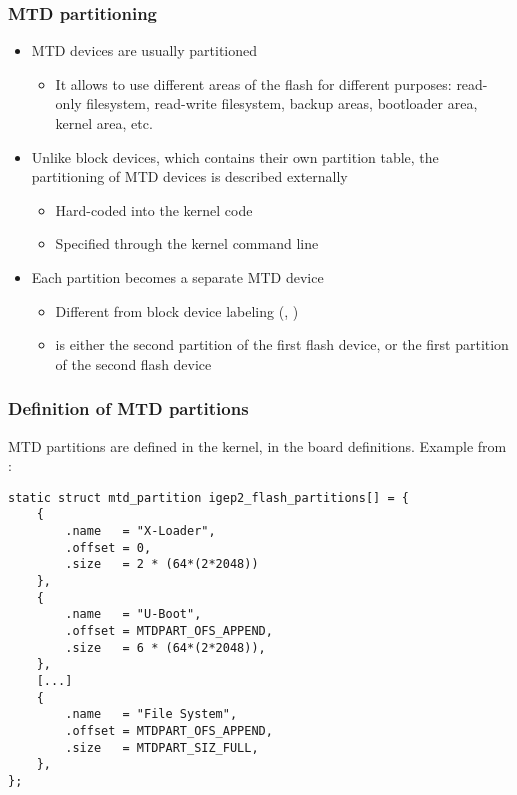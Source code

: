 \begin{frame}
  \frametitle{MTD partitioning}
  \begin{itemize}
  \item MTD devices are usually partitioned
    \begin{itemize}
    \item It allows to use different areas of the flash for different
      purposes: read-only filesystem, read-write filesystem, backup
      areas, bootloader area, kernel area, etc.
    \end{itemize}
  \item Unlike block devices, which contains their own partition
    table, the partitioning of MTD devices is described externally
    \begin{itemize}
    \item Hard-coded into the kernel code
    \item Specified through the kernel command line
    \end{itemize}
  \item Each partition becomes a separate MTD device
    \begin{itemize}
    \item Different from block device labeling (,
      )
    \item {} is either the second partition of the first
      flash device, or the first partition of the second flash device
\end{itemize}
\end{itemize}
\end{frame}

\begin{frame}[fragile]
  \frametitle{Definition of MTD partitions}

  MTD partitions are defined in the kernel, in the board
  definitions. Example from
  :
\scriptsize
\begin{verbatim}
static struct mtd_partition igep2_flash_partitions[] = {
    {
        .name   = "X-Loader",
        .offset = 0,
        .size   = 2 * (64*(2*2048))
    },
    {
        .name   = "U-Boot",
        .offset = MTDPART_OFS_APPEND,
        .size   = 6 * (64*(2*2048)),
    },
    [...]
    {
        .name   = "File System",
        .offset = MTDPART_OFS_APPEND,
        .size   = MTDPART_SIZ_FULL,
    },
};
\end{verbatim}
\end{frame}

